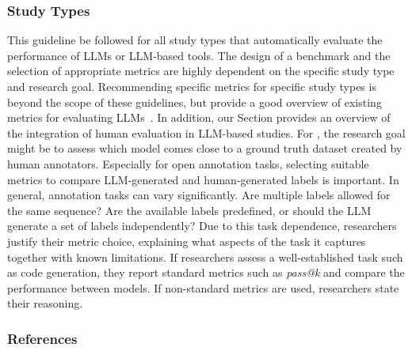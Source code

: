 \subsubsection{Study Types}

This guideline \must be followed for all study types that automatically evaluate the performance of LLMs or LLM-based tools.
The design of a benchmark and the selection of appropriate metrics are highly dependent on the specific study type and research goal.
Recommending specific metrics for specific study types is beyond the scope of these guidelines, but \citeauthor{hu2025assessingadvancingbenchmarksevaluating} provide a good overview of existing metrics for evaluating LLMs~\cite{hu2025assessingadvancingbenchmarksevaluating}.
In addition, our Section \humanvalidation provides an overview of the integration of human evaluation in LLM-based studies. 
For \annotators, the research goal might be to assess which model comes close to a ground truth dataset created by human annotators.
Especially for open annotation tasks, selecting suitable metrics to compare LLM-generated and human-generated labels is important.
In general, annotation tasks can vary significantly.
Are multiple labels allowed for the same sequence? Are the available labels predefined, or should the LLM generate a set of labels independently?
Due to this task dependence, researchers \must justify their metric choice, explaining what aspects of the task it captures together with known limitations.
If researchers assess a well-established task such as code generation, they \should report standard metrics such as \emph{pass@k} and compare the performance between models.
If non-standard metrics are used, researchers \must state their reasoning.

\subsubsection{References}





